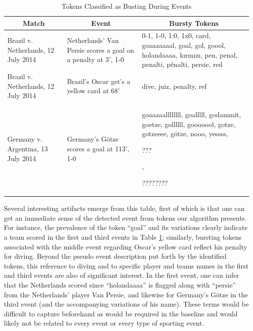 \documentclass{acm_proc_article-sp}
\begin{document}
\begin{table}[htdp]
\caption{Tokens Classified as Busting During Events}
\begin{center}
\begin{tabular}{|p{0.75in}|p{0.7in}| p{1.45in} |}
\hline
\multicolumn{1}{|c|}{\textbf{Match}} & \multicolumn{1}{|c|}{\textbf{Event}} & \multicolumn{1}{|c|}{\textbf{Bursty Tokens}} \\ \hline
Brazil v. Netherlands, 12 July 2014 & Netherlands' Van Persie scores a goal on a penalty at 3', 1-0 & 0-1, 1-0, 1:0, 1x0, card, goaaaaaaal, goal, gol, goool, holandaaaa, k\i{}rm\i{}z\i{}, pen, penal, penalti, p\^{e}nalti, persie, red \\ \hline
Brazil v. Netherlands, 12 July 2014 & Brazil's Oscar get's a yellow card at 68' & dive, juiz, penalty, ref \\ \hline
Germany v. Argentina, 13 July 2014 & Germany's G\"{o}tze scores a goal at 113', 1-0 & goaaaaallllllll, goalllll, godammit, goetze, gollllll, gooooool, gotze, gotzeeee, g\"{o}tze, nooo, yessss, \begin{CJK*}{UTF8}{zhsong}???\end{CJK*}, \begin{CJK}{UTF8}{zhsong}????????\end{CJK}  \\ \hline
\end{tabular}
\end{center}
\label{tab:burstyTokens}
\end{table}

Several interesting artifacts emerge from this table, first of which is that one can get an immediate sense of the detected event from tokens our algorithm presents. 
For instance, the prevalence of the token ``goal'' and its variations clearly indicate a team scored in the first and third events in Table \ref{tab:burstyTokens}; similarly, bursting tokens associated with the middle event regarding Oscar's yellow card reflect his penalty for diving.
Beyond the pseudo event description put forth by the identified tokens, this reference to diving and to specific player and teams names in the first and third events are also of significant interest.
In the first event, one can infer that the Netherlands scored since ``holandaaaa'' is flagged along with ``persie'' from the Netherlands' player Van Persie, and likewise for Germany's G\"{o}tze in the third event (and the accompanying variations of his name).
These terms would be difficult to capture beforehand as would be required in the baseline and would likely not be related to every event or every type of sporting event.
\end{document}
